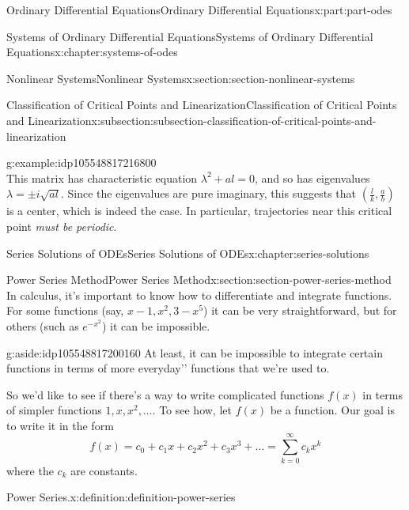 \documentclass[twoside,10pt,]{book}
\numberwithin{equation}{part}
\begin{document}
\begin{partptx}{Ordinary Differential Equations}{}{Ordinary Differential Equations}{}{}{x:part:part-odes}
\begin{chapterptx}{Systems of Ordinary Differential Equations}{}{Systems of Ordinary Differential Equations}{}{}{x:chapter:systems-of-odes}
\begin{sectionptx}{Nonlinear Systems}{}{Nonlinear Systems}{}{}{x:section:section-nonlinear-systems}
\begin{subsectionptx}{Classification of Critical Points and Linearization}{}{Classification of Critical Points and Linearization}{}{}{x:subsection:subsection-classification-of-critical-points-and-linearization}
\begin{example}{}{g:example:idp105548817216800}
\begin{equation*}
\end{equation*}
This matrix has characteristic equation \(\lambda^{2} + al = 0\), and so has eigenvalues \(\lambda=\pm i\sqrt{al}\). Since the eigenvalues are pure imaginary, this suggests that \((\frac{l}{k},\frac{a}{b})\) is a center, which is indeed the case. In particular, trajectories near this critical point \emph{must be periodic}.%
\end{example}
\end{subsectionptx}
\end{sectionptx}
\end{chapterptx}
%
\typeout{************************************************}
\typeout{************************************************}
%
\begin{chapterptx}{Series Solutions of ODEs}{}{Series Solutions of ODEs}{}{}{x:chapter:series-solutions}
%
%
\typeout{************************************************}
\typeout{************************************************}
%
\begin{sectionptx}{Power Series Method}{}{Power Series Method}{}{}{x:section:section-power-series-method}
In calculus, it's important to know how to differentiate and integrate functions. For some functions (say, \(x-1,x^{2},3-x^{5}\)) it can be very straightforward, but for others (such as \(e^{-x^{2}}\)) it can be impossible. \begin{aside}{}{g:aside:idp105548817200160}%
At least, it can be impossible to integrate certain functions in terms of more \textasciigrave{}\textasciigrave{}everyday'{}'{} functions that we're used to.%
\end{aside}
%
\par
So we'd like to see if there's a way to write complicated functions \(f(x)\) in terms of simpler functions \(1,x,x^{2},\dots\). To see how, let \(f(x)\) be a function. Our goal is to write it in the form%
\begin{equation}
f(x) = c_{0}+c_{1}x+c_{2}x^{2}+c_{3}x^{3}+\dots = \sum_{k=0}^{\infty}c_{k}x^{k}\label{x:men:equation-power-series-at-zero}
\end{equation}
where the \(c_{k}\) are constants.%
\begin{definition}{Power Series.}{x:definition:definition-power-series}%

\end{definition}
\end{sectionptx}
\end{chapterptx}
\end{partptx}
\end{document}
